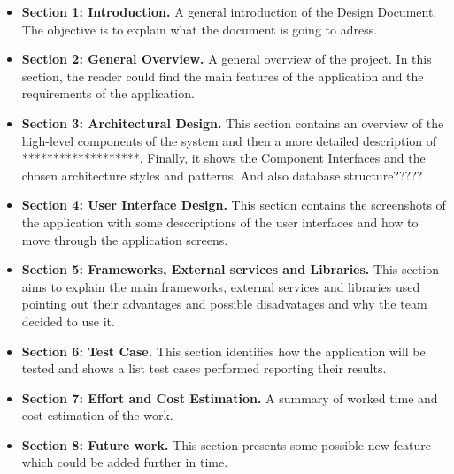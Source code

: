 		\begin{itemize}
			\item \textbf{Section 1: Introduction.} A general introduction of the Design Document. The objective is to explain what the document is going to adress.

			\item \textbf {Section 2: General Overview.} A general overview of the project. In this section, the reader could find the main features of the application and
			the requirements of the application.

			\item \textbf{Section 3: Architectural Design.} This section contains an overview of the high-level components of the system and then a more detailed 
			description of *******************. Finally, it shows the Component Interfaces and the chosen architecture styles and patterns. And also database structure?????
			
			\item \textbf{Section 4: User Interface Design.} This section contains the screenshots of the application with some desccriptions of the user interfaces 
			and how to move through the application screens.
			
			\item \textbf{Section 5: Frameworks, External services and Libraries.} This section aims to explain the main frameworks, external services and libraries used 
			pointing out their advantages and possible disadvatages and why the team decided to use it.
			
			\item \textbf{Section 6: Test Case.} This section identifies how the application will be tested and shows a list test cases performed reporting their results.
			
			\item \textbf{Section 7: Effort and Cost Estimation.} A summary of worked time and cost estimation of the work.
			
			\item \textbf{Section 8: Future work.} This section presents some possible new feature which could be added further in time.
		\end{itemize}